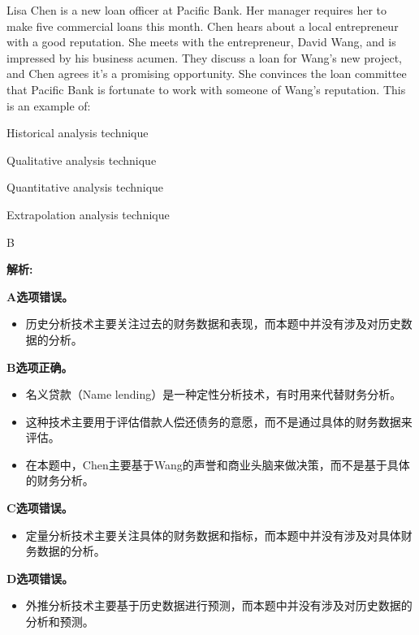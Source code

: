 \documentclass{article}
\newcounter{question} %
\newenvironment{explanation}
{\textbf{解析:}\par}
{\par}
\begin{document}
\begin{question}
    Lisa Chen is a new loan officer at Pacific Bank. Her manager requires her to make five commercial loans this month. Chen hears about a local entrepreneur with a good reputation. She meets with the entrepreneur, David Wang, and is impressed by his business acumen. They discuss a loan for Wang's new project, and Chen agrees it's a promising opportunity. She convinces the loan committee that Pacific Bank is fortunate to work with someone of Wang's reputation. This is an example of:
\end{question}

\begin{choices}
    \item Historical analysis technique
    \item Qualitative analysis technique
    \item Quantitative analysis technique
    \item Extrapolation analysis technique
\end{choices}

\begin{correctanswer}
    B
\end{correctanswer}

\begin{explanation}
    \textbf{A选项错误。}
    \begin{itemize}
        \item 历史分析技术主要关注过去的财务数据和表现，而本题中并没有涉及对历史数据的分析。
    \end{itemize}
    
    \textbf{B选项正确。}
    \begin{itemize}
        \item 名义贷款（Name lending）是一种定性分析技术，有时用来代替财务分析。
        \item 这种技术主要用于评估借款人偿还债务的意愿，而不是通过具体的财务数据来评估。
        \item 在本题中，Chen主要基于Wang的声誉和商业头脑来做决策，而不是基于具体的财务分析。
    \end{itemize}
    
    \textbf{C选项错误。}
    \begin{itemize}
        \item 定量分析技术主要关注具体的财务数据和指标，而本题中并没有涉及对具体财务数据的分析。
    \end{itemize}
    
    \textbf{D选项错误。}
    \begin{itemize}
        \item 外推分析技术主要基于历史数据进行预测，而本题中并没有涉及对历史数据的分析和预测。
    \end{itemize}
\end{explanation}
\end{document}
